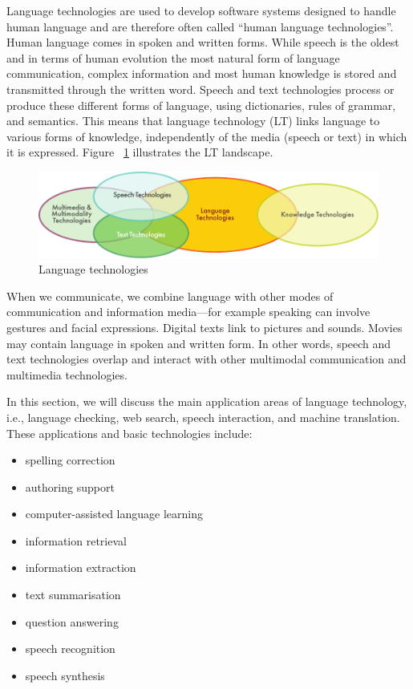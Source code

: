 \begin{multicols}{2}

Language technologies are used to develop software systems designed to handle human language and are therefore often called “human language technologies”. Human language comes in spoken and written forms. While speech is the oldest and in terms of human evolution the most natural form of language communication, complex information and most human knowledge is stored and transmitted through the written word. Speech and text technologies process or produce these different forms of language, using dictionaries, rules of grammar, and semantics. This means that language technology (LT) links language to various forms of knowledge, independently of the media (speech or text) in which it is expressed. Figure ~\ref{fig:ltincontext_en} illustrates the LT landscape.

\begin{figure}[htb]
  \center
  \includegraphics[width=\textwidth]{../_media/english/language_technologies}
  \caption{Language technologies}
  \label{fig:ltincontext_en}
\end{figure}

When we communicate, we combine language with other modes of communication and information media—for example speaking can involve gestures and facial expressions. Digital texts link to pictures and sounds. Movies may contain language in spoken and written form. In other words, speech and text technologies overlap and interact with other multimodal communication and multimedia technologies.

In this section, we will discuss the main application areas of language technology, i.e., language checking, web search, speech interaction, and machine translation. These applications and basic technologies include:

\begin{itemize}
\item spelling correction
\item authoring support
\item computer-assisted language learning
\item information retrieval
\item information extraction
\item text summarisation
\item question answering
\item speech recognition
\item speech synthesis
\end{itemize}


\end{multicols}
